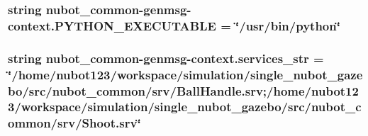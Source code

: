 \hypertarget{namespacenubot__common-genmsg-context_a07f30a33447f3b83a20605f1732e2763}{
\subsubsection[{P\-Y\-T\-H\-O\-N\-\_\-\-E\-X\-E\-C\-U\-T\-A\-B\-L\-E}]{\setlength{\rightskip}{0pt plus 5cm}string nubot\-\_\-common-\/genmsg-\/context.\-P\-Y\-T\-H\-O\-N\-\_\-\-E\-X\-E\-C\-U\-T\-A\-B\-L\-E = \char`\"{}/usr/bin/python\char`\"{}}}\label{namespacenubot__common-genmsg-context_a07f30a33447f3b83a20605f1732e2763}
\hypertarget{namespacenubot__common-genmsg-context_a1e2a824c1778c805a4593863a72ba35e}{
\subsubsection[{services\-\_\-str}]{\setlength{\rightskip}{0pt plus 5cm}string nubot\-\_\-common-\/genmsg-\/context.\-services\-\_\-str = \char`\"{}/home/nubot123/workspace/simulation/single\-\_\-nubot\-\_\-gazebo/src/nubot\-\_\-common/srv/Ball\-Handle.\-srv;/home/nubot123/workspace/simulation/single\-\_\-nubot\-\_\-gazebo/src/nubot\-\_\-common/srv/Shoot.\-srv\char`\"{}}}\label{namespacenubot__common-genmsg-context_a1e2a824c1778c805a4593863a72ba35e}
